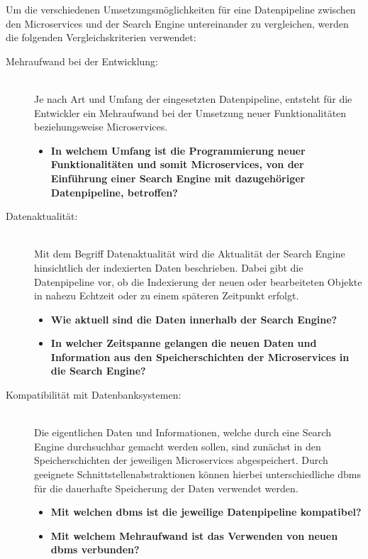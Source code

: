 Um die verschiedenen Umsetzungsmöglichkeiten für eine Datenpipeline zwischen den Microservices und der Search Engine untereinander zu vergleichen, werden die folgenden Vergleichskriterien verwendet:

\begin{description}
    \item[Mehraufwand bei der Entwicklung:]\hfill \\
    Je nach Art und Umfang der eingesetzten Datenpipeline, entsteht für die Entwickler ein Mehraufwand bei der Umsetzung neuer Funktionalitäten beziehungsweise Microservices.
    
    \begin{itemize}
        \item \textbf{In welchem Umfang ist die Programmierung neuer Funktionalitäten und somit Microservices, von der Einführung einer Search Engine mit dazugehöriger Datenpipeline, betroffen?}
    \end{itemize}

    \item[Datenaktualität:]\hfill \\
    Mit dem Begriff \glqq Datenaktualität\grqq{} wird die Aktualität der Search Engine hinsichtlich der indexierten Daten beschrieben. Dabei gibt die Datenpipeline vor, ob die Indexierung der neuen oder bearbeiteten Objekte in nahezu Echtzeit oder zu einem späteren Zeitpunkt erfolgt.

    \begin{itemize}
        \item \textbf{Wie aktuell sind die Daten innerhalb der Search Engine?}
        \item \textbf{In welcher Zeitspanne gelangen die neuen Daten und Information aus den Speicherschichten der Microservices in die Search Engine?}
    \end{itemize}
    
    \item[Kompatibilität mit Datenbanksystemen:]\hfill \\
    Die eigentlichen Daten und Informationen, welche durch eine Search Engine \glqq durchsuchbar\grqq{} gemacht werden sollen, sind zunächst in den Speicherschichten der jeweiligen Microservices abgespeichert. Durch geeignete Schnittstellenabstraktionen können hierbei unterschiedliche \gls{dbms} für die dauerhafte Speicherung der Daten verwendet werden.

    \begin{itemize}
        \item \textbf{Mit welchen \gls{dbms} ist die jeweilige Datenpipeline kompatibel?}
        \item \textbf{Mit welchem Mehraufwand ist das Verwenden von \glqq neuen\grqq{} \gls{dbms} verbunden?}
    \end{itemize}
    

\end{description}
